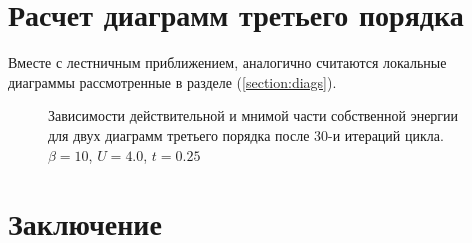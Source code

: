 \documentclass[11pt,a4paper]{report}
\begin{document}
\section{Расчет диаграмм третьего порядка}

Вместе с лестничным приближением, аналогично считаются локальные диаграммы рассмотренные в разделе (\ref{section:diags}).

\begin{figure}[H]
\centering
{}

\caption{Зависимости действительной и мнимой части собственной энергии для двух диаграмм третьего порядка после 30-и итераций цикла. $\beta=10$, $U=4.0$, $t=0.25$}
\label{Sigma}
\end{figure}

\section{Заключение}
\end{document}
